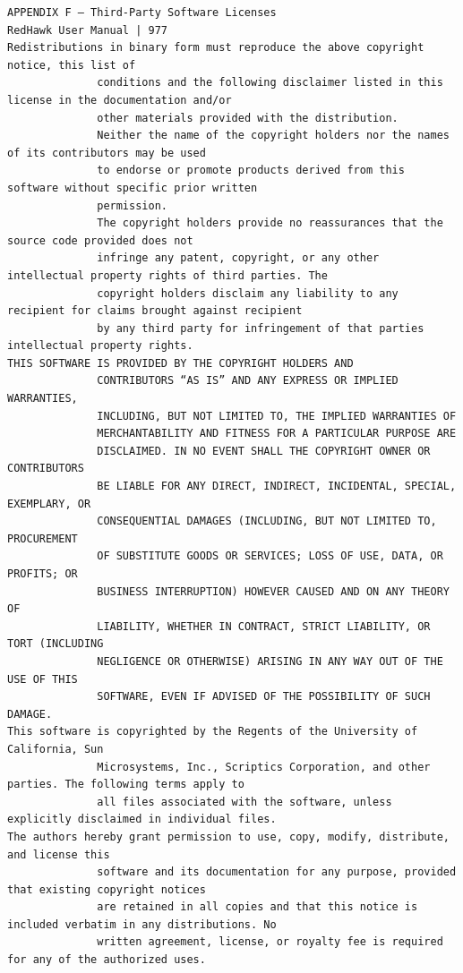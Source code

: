 \begin{lstlisting}[basicstyle=\ttfamily\scriptsize,breaklines=true]
APPENDIX F — Third-Party Software Licenses                                     RedHawk User Manual | 977
Redistributions in binary form must reproduce the above copyright notice, this list of
              conditions and the following disclaimer listed in this license in the documentation and/or
              other materials provided with the distribution.
              Neither the name of the copyright holders nor the names of its contributors may be used
              to endorse or promote products derived from this software without specific prior written
              permission.
              The copyright holders provide no reassurances that the source code provided does not
              infringe any patent, copyright, or any other intellectual property rights of third parties. The
              copyright holders disclaim any liability to any recipient for claims brought against recipient
              by any third party for infringement of that parties intellectual property rights.
THIS SOFTWARE IS PROVIDED BY THE COPYRIGHT HOLDERS AND
              CONTRIBUTORS “AS IS” AND ANY EXPRESS OR IMPLIED WARRANTIES,
              INCLUDING, BUT NOT LIMITED TO, THE IMPLIED WARRANTIES OF
              MERCHANTABILITY AND FITNESS FOR A PARTICULAR PURPOSE ARE
              DISCLAIMED. IN NO EVENT SHALL THE COPYRIGHT OWNER OR CONTRIBUTORS
              BE LIABLE FOR ANY DIRECT, INDIRECT, INCIDENTAL, SPECIAL, EXEMPLARY, OR
              CONSEQUENTIAL DAMAGES (INCLUDING, BUT NOT LIMITED TO, PROCUREMENT
              OF SUBSTITUTE GOODS OR SERVICES; LOSS OF USE, DATA, OR PROFITS; OR
              BUSINESS INTERRUPTION) HOWEVER CAUSED AND ON ANY THEORY OF
              LIABILITY, WHETHER IN CONTRACT, STRICT LIABILITY, OR TORT (INCLUDING
              NEGLIGENCE OR OTHERWISE) ARISING IN ANY WAY OUT OF THE USE OF THIS
              SOFTWARE, EVEN IF ADVISED OF THE POSSIBILITY OF SUCH DAMAGE.
This software is copyrighted by the Regents of the University of California, Sun
              Microsystems, Inc., Scriptics Corporation, and other parties. The following terms apply to
              all files associated with the software, unless explicitly disclaimed in individual files.
The authors hereby grant permission to use, copy, modify, distribute, and license this
              software and its documentation for any purpose, provided that existing copyright notices
              are retained in all copies and that this notice is included verbatim in any distributions. No
              written agreement, license, or royalty fee is required for any of the authorized uses.

\end{lstlisting}
